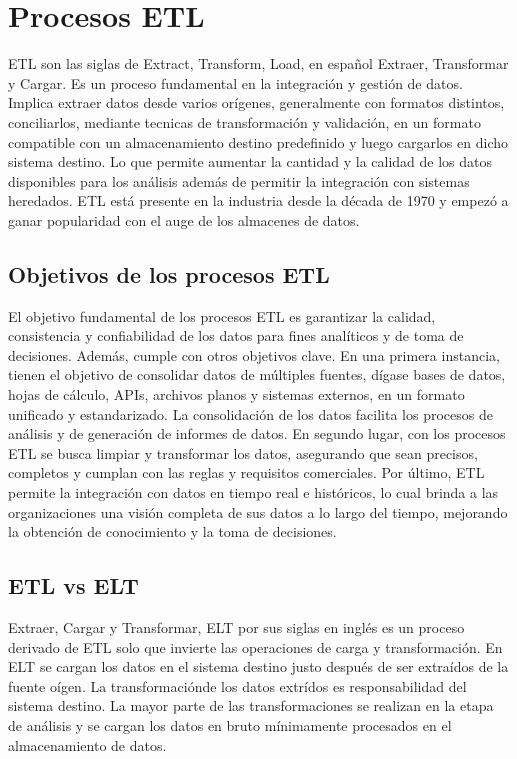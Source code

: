 \section{Procesos ETL}\label{section:etl}

ETL son las siglas de  Extract, Transform, Load, en español Extraer, Transformar y Cargar. Es un proceso fundamental en la 
integración y gestión de datos. Implica extraer datos desde varios or\'igenes, generalmente con formatos distintos, 
conciliarlos, mediante tecnicas de transformación y validaci\'on, en un formato compatible con un almacenamiento destino 
predefinido y luego cargarlos en dicho sistema destino. Lo que permite aumentar la cantidad y la calidad de los datos 
disponibles para los an\'alisis adem\'as de permitir la integración con sistemas heredados. ETL est\'a presente en la 
industria desde la década de 1970 y empez\'o a ganar popularidad con el auge de los almacenes de datos\cite{etl_vs_elt_amazon}.

\subsection{Objetivos de los procesos ETL}

El objetivo fundamental de los procesos ETL es garantizar la calidad, consistencia y confiabilidad de los datos para 
fines anal\'iticos y de toma de decisiones. Adem\'as, cumple con otros objetivos clave. En una primera instancia, 
tienen el objetivo de consolidar datos de m\'ultiples fuentes, d\'igase bases de datos, hojas de c\'alculo, APIs, 
archivos planos y sistemas externos, en un formato unificado y estandarizado. La consolidación de los datos facilita 
los procesos de an\'alisis y de generación de informes de datos. En segundo lugar, con los procesos ETL se busca 
limpiar y transformar los datos, asegurando que sean precisos, completos y cumplan con las reglas y requisitos comerciales. 
Por \'ultimo, ETL permite la integración con datos en tiempo real e históricos, lo cual brinda a las organizaciones una visión 
completa de sus datos a lo largo del tiempo, mejorando la obtenci\'on de conocimiento y la toma de decisiones.

\subsection{ETL vs ELT}

Extraer, Cargar y Transformar, ELT por sus siglas en ingl\'es es un proceso derivado de ETL solo que invierte las operaciones 
de carga y transformación. En ELT se cargan los datos en el sistema destino justo despu\'es de ser extra\'idos de la fuente 
o\'igen. La transformaciónde los datos extr\'idos es responsabilidad del sistema destino. La mayor parte de las 
transformaciones se realizan en la etapa de análisis y se cargan los datos en bruto mínimamente procesados en el 
almacenamiento de datos.

